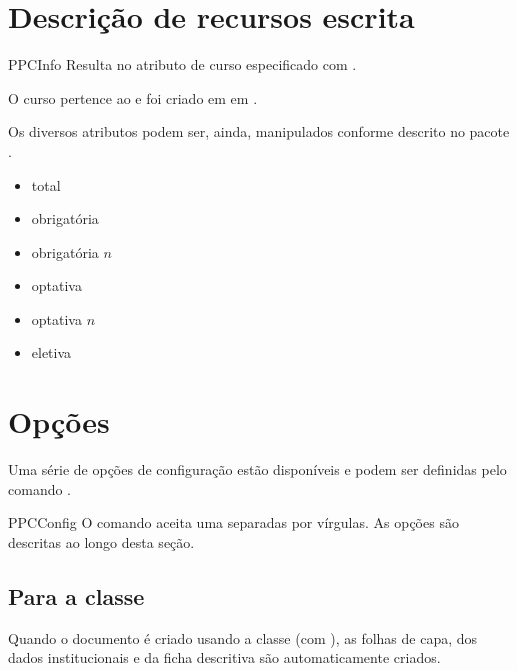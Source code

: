 \documentclass[a4paper, 11pt]{article}
\begin{document}
\section{Descrição de recursos escrita}

\begin{Macrodef}{PPCInfo}{}{}
    Resulta no atributo de curso especificado com .
\end{Macrodef}

\begin{PDExample}
    O curso pertence ao  e foi criado em em .
\end{PDExample}

Os diversos atributos podem ser, ainda, manipulados conforme descrito no pacote .

\begin{itemize}
    \item total
    \item obrigatória
    \item obrigatória $n$
    \item optativa
    \item optativa $n$
    \item eletiva
\end{itemize}


\section{Opções}
Uma série de opções de configuração estão disponíveis e podem ser definidas pelo comando .

\begin{Macrodef}{PPCConfig}{}{}
    O comando  aceita uma  separadas por vírgulas. As opções são descritas ao longo desta seção.
\end{Macrodef}

\subsection{Para a classe }
Quando o documento é criado usando a classe  (com ), as folhas de capa, dos dados institucionais e da ficha descritiva são automaticamente criados.
\end{document}
